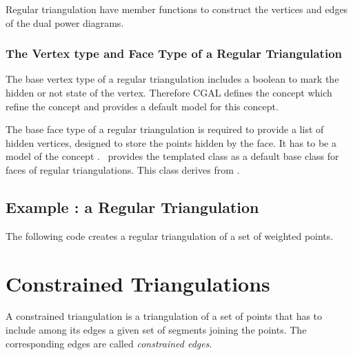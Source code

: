 Regular triangulation have member functions to construct
the vertices and edges of the dual power diagrams.


\subsubsection{The Vertex type and Face Type of a Regular Triangulation}

The base vertex type of a regular triangulation
includes a boolean to mark the hidden or not state of the vertex.
Therefore  CGAL defines the concept
 which refine
the concept 
and provides a default model 
for this concept.

The base face type of a regular triangulation
is required to provide a list of hidden vertices,
designed to store the points hidden by the face. It has to be a model
of the concept .
\cgal\ provides the templated class 
as a default base class for faces of regular triangulations.
This class  derives from .


\subsection{Example : a Regular Triangulation}
\label{Subsection_2D_Triangulations_Regular_Example}

The following code  creates a regular triangulation 
of a set of weighted points.



\section{Constrained Triangulations}
\label{Section_2D_Triangulations_Constrained}

\label{Subsection_2D_Triangulations_Constrained_Description}
A constrained triangulation is a triangulation of a set of points
that has to include among its edges 
a given set of segments joining the points. The corresponding 
edges are called {\em constrained edges}. 

